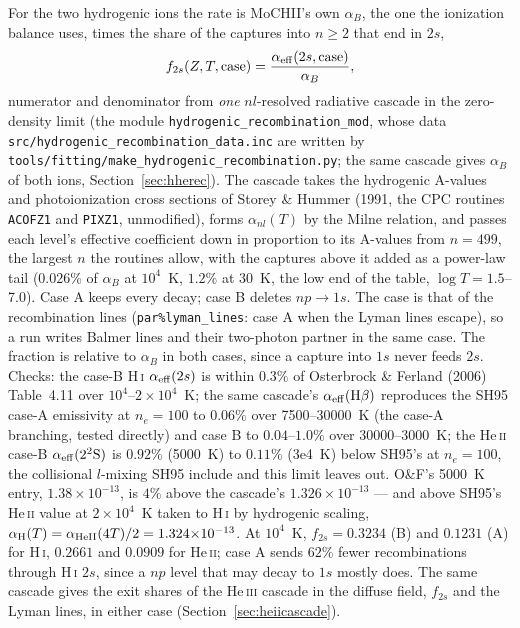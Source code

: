 \documentclass[english,a4paper]{my_memo}
\newcommand{\code}[1]{\texttt{#1}}
\begin{document}
For the two hydrogenic ions the rate is MoCHII's own $\alpha_B$, the one the
ionization balance uses, times the share of the captures into $n\ge2$ that
end in $2s$,
\begin{equation}
  f_{2s}(Z, T, {\rm case}) = \frac{\alpha_{\rm eff}(2s, {\rm case})}{\alpha_B},
\end{equation}
numerator and denominator from \emph{one} $nl$-resolved radiative cascade in
the zero-density limit (the module \code{hydrogenic\_recombination\_mod}, whose
data \code{src/\allowbreak hydrogenic\_recombination\_data.inc} are written by
\code{tools/\allowbreak fitting/\allowbreak make\_hydrogenic\_recombination.py}; the same cascade
gives $\alpha_B$ of both ions, Section~\ref{sec:hherec}).  The cascade
takes the hydrogenic A-values and photoionization cross sections of Storey \&
Hummer (1991, the CPC routines \code{ACOFZ1} and \code{PIXZ1}, unmodified),
forms $\alpha_{nl}(T)$ by the Milne relation, and passes each level's
effective coefficient down in proportion to its A-values from $n = 499$, the
largest $n$ the routines allow, with the captures above it added as a
power-law tail ($0.026\%$ of $\alpha_B$ at $10^4$~K, $1.2\%$ at 30~K, the
low end of the table, $\log T = 1.5$--7.0).  Case A keeps every decay; case B
deletes $np\to1s$.  The case is that of the recombination lines
(\code{par\%lyman\_lines}: case A when the Lyman lines escape), so a run
writes Balmer lines and their two-photon partner in the same case.  The
fraction is relative to $\alpha_B$ in both cases, since a capture into $1s$
never feeds $2s$.  Checks: the case-B H\,\textsc{i} $\alpha_{\rm eff}(2s)$
is within $0.3\%$ of Osterbrock \& Ferland (2006) Table~4.11 over
$10^4$--$2{\times}10^4$~K; the same cascade's $\alpha_{\rm eff}({\rm H}\beta)$
reproduces the SH95 case-A emissivity at $n_e = 100$ to $0.06\%$ over
7500--30000~K (the case-A branching, tested directly) and case B to
$0.04$--$1.0\%$ over 30000--3000~K; the He\,\textsc{ii} case-B $\alpha_{\rm eff}(2^2{\rm S})$ is
$0.92\%$ (5000~K) to $0.11\%$ (3e4~K) below SH95's at $n_e = 100$, the
collisional $l$-mixing SH95 include and this limit leaves out.  O\&F's
5000~K entry, $1.38{\times}10^{-13}$, is $4\%$ above the cascade's
$1.326{\times}10^{-13}$ --- and above SH95's He\,\textsc{ii} value at
$2{\times}10^4$~K taken to H\,\textsc{i} by hydrogenic scaling,
$\alpha_{\rm H}(T) = \alpha_{\rm HeII}(4T)/2 = 1.324{\times}10^{-13}$.  At
$10^4$~K, $f_{2s} = 0.3234$ (B) and $0.1231$ (A) for H\,\textsc{i}, $0.2661$
and $0.0909$ for He\,\textsc{ii}; case A sends $62\%$ fewer recombinations
through H\,\textsc{i} $2s$, since a $np$ level that may decay to $1s$ mostly
does.  The same cascade gives the exit shares of the He\,\textsc{iii}
cascade in the diffuse field, $f_{2s}$ and the Lyman lines, in either case
(Section~\ref{sec:heiicascade}).
\end{document}
